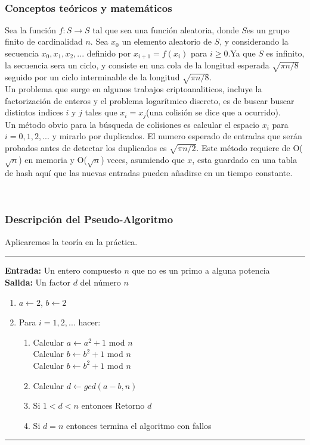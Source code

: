 \documentclass[11pt, conference]{IEEEtran}
\begin{document}
\

\subsubsection[Conceptos teóricos y matemáticos]{\textbf{Conceptos teóricos y matemáticos}} Sea la función $f: S\rightarrow S$ tal que sea una función aleatoria, donde $S$es un grupo finito de cardinalidad $n$. Sea $x_0$ un elemento aleatorio de $S$, y considerando la secuencia $x_0, x_1, x_2,...$ definido por $x_{i+1} = f(x_{i})$ para $i\geq 0$.Ya que $S$ es infinito, la secuencia sera un ciclo, y consiste en una cola de la longitud esperada $\sqrt{\pi n/8}$ seguido por un ciclo interminable de la longitud $\sqrt{\pi n/8}$.\\

Un problema que surge en algunos trabajos criptoanaliticos, incluye la factorización de enteros y el problema logarítmico discreto, es de buscar buscar distintos indices $i$ y $j$ tales que $x_{i} = x_{j}$(una colisión se dice que a ocurrido).\\

Un método obvio para la búsqueda de colisiones es calcular el espacio $x_{i}$ para $i = 0, 1,2,...$ y mirarlo por duplicados. El numero esperado de entradas que serán probados antes de detectar los duplicados es $\sqrt{\pi n/2}$. Este método requiere de O($\sqrt{n}$) en memoria y O($\sqrt{n}$) veces, asumiendo que $x$, esta guardado en una tabla de hash aquí que las nuevas entradas pueden añadirse en un tiempo constante.

\

\subsubsection[Descripción del Pseudo-Algoritmo]{\textbf{Descripción del Pseudo-Algoritmo}}
Aplicaremos la teoría en la práctica.\\ 
\rule[0mm]{181mm}{0.1mm}
\textbf{Entrada:} Un entero compuesto $n$ que no es un primo a alguna potencia\\
\textbf{Salida:} Un factor $d$ del número $n$
\begin{enumerate}
	\item $a \leftarrow 2$, $b \leftarrow 2$
	\item Para $i = 1,2,...$ hacer:
	\begin{enumerate}
		\item Calcular $a\leftarrow a^{2}+1$ mod $n$\\
		Calcular $b\leftarrow b^{2}+1$ mod $n$\\
		Calcular $b\leftarrow b^{2}+1$ mod $n$
		\item Calcular $d\leftarrow gcd(a-b,n)$
		\item Si $1 < d < n$ entonces Retorno $d$
		\item Si $d=n$ entonces termina el algoritmo con fallos
	\end{enumerate}
\end{enumerate}
\rule[3mm]{181mm}{0.1mm}
\end{document}
